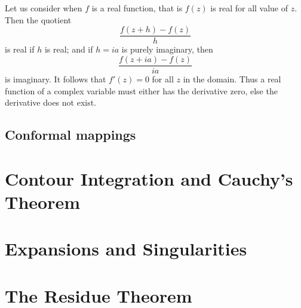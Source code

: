 \documentclass[main.tex]{subfiles}
\begin{document}
	 Let us consider when $f$ is a real function, that is $f(z)$ is real for all value of $z$. Then the quotient
	 \begin{equation*}
		 \frac{f(z + h) - f(z)}{h}
	 \end{equation*}
	is real if $h$ is real; and if $h = ia$ is purely imaginary, then
	\begin{equation*}
	\frac{f(z + ia) - f(z)}{ia}
	\end{equation*}
	is imaginary. It follows that $f'(z) = 0$ for all $z$ in the domain. Thus a real function of a complex variable must either has the derivative zero, else the derivative does not exist.
	
	\subsection{Conformal mappings}
	
	\section{Contour Integration and Cauchy's Theorem}
		
	\section{Expansions and Singularities}
		
	\section{The Residue Theorem}
				
\end{document}
